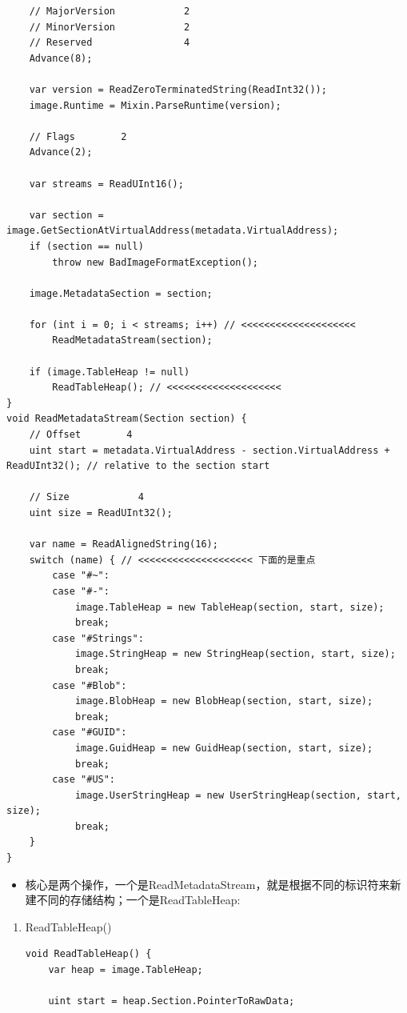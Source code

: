 \documentclass[9pt, b5paper]{article}
\begin{document}
\begin{enumerate}
\begin{enumerate}
\begin{enumerate}
\begin{verbatim}
    // MajorVersion            2
    // MinorVersion            2
    // Reserved                4
    Advance(8);

    var version = ReadZeroTerminatedString(ReadInt32());
    image.Runtime = Mixin.ParseRuntime(version);

    // Flags        2
    Advance(2);

    var streams = ReadUInt16();

    var section = image.GetSectionAtVirtualAddress(metadata.VirtualAddress);
    if (section == null)
        throw new BadImageFormatException();

    image.MetadataSection = section;

    for (int i = 0; i < streams; i++) // <<<<<<<<<<<<<<<<<<<< 
        ReadMetadataStream(section);

    if (image.TableHeap != null)
        ReadTableHeap(); // <<<<<<<<<<<<<<<<<<<< 
}
void ReadMetadataStream(Section section) {
    // Offset        4
    uint start = metadata.VirtualAddress - section.VirtualAddress + ReadUInt32(); // relative to the section start

    // Size            4
    uint size = ReadUInt32();

    var name = ReadAlignedString(16);
    switch (name) { // <<<<<<<<<<<<<<<<<<<< 下面的是重点
        case "#~":
        case "#-":
            image.TableHeap = new TableHeap(section, start, size);
            break;
        case "#Strings":
            image.StringHeap = new StringHeap(section, start, size);
            break;
        case "#Blob":
            image.BlobHeap = new BlobHeap(section, start, size);
            break;
        case "#GUID":
            image.GuidHeap = new GuidHeap(section, start, size);
            break;
        case "#US":
            image.UserStringHeap = new UserStringHeap(section, start, size);
            break;
    }
}
\end{verbatim}
\begin{itemize}
\item 核心是两个操作，一个是ReadMetadataStream，就是根据不同的标识符来新建不同的存储结构；一个是ReadTableHeap:
\end{itemize}
\begin{enumerate}
\item ReadTableHeap()
\label{sec-10-1-3-1-3-4-1}
\begin{verbatim}
void ReadTableHeap() {
    var heap = image.TableHeap;

    uint start = heap.Section.PointerToRawData;


\end{verbatim}
\end{enumerate}
\end{enumerate}
\end{enumerate}
\end{enumerate}
\end{document}
